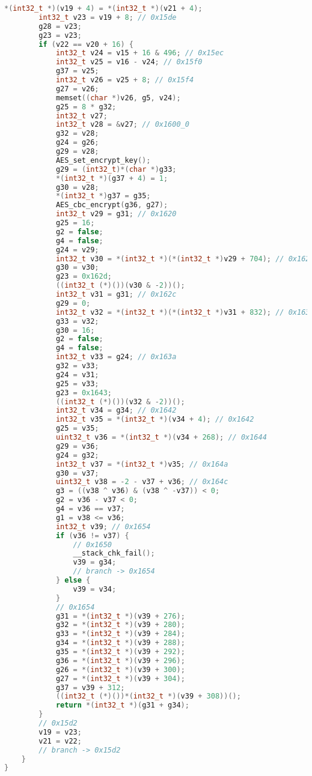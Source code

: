 \begin{appendices}
\begin{lstlisting}[language=C++, caption=Decompiled AES Encrypt(), label=dec_aes_encrypt]
        *(int32_t *)(v19 + 4) = *(int32_t *)(v21 + 4);
        int32_t v23 = v19 + 8; // 0x15de
        g28 = v23;
        g23 = v23;
        if (v22 == v20 + 16) {
            int32_t v24 = v15 + 16 & 496; // 0x15ec
            int32_t v25 = v16 - v24; // 0x15f0
            g37 = v25;
            int32_t v26 = v25 + 8; // 0x15f4
            g27 = v26;
            memset((char *)v26, g5, v24);
            g25 = 8 * g32;
            int32_t v27;
            int32_t v28 = &v27; // 0x1600_0
            g32 = v28;
            g24 = g26;
            g29 = v28;
            AES_set_encrypt_key();
            g29 = (int32_t)*(char *)g33;
            *(int32_t *)(g37 + 4) = 1;
            g30 = v28;
            *(int32_t *)g37 = g35;
            AES_cbc_encrypt(g36, g27);
            int32_t v29 = g31; // 0x1620
            g25 = 16;
            g2 = false;
            g4 = false;
            g24 = v29;
            int32_t v30 = *(int32_t *)(*(int32_t *)v29 + 704); // 0x1626
            g30 = v30;
            g23 = 0x162d;
            ((int32_t (*)())(v30 & -2))();
            int32_t v31 = g31; // 0x162c
            g29 = 0;
            int32_t v32 = *(int32_t *)(*(int32_t *)v31 + 832); // 0x1634
            g33 = v32;
            g30 = 16;
            g2 = false;
            g4 = false;
            int32_t v33 = g24; // 0x163a
            g32 = v33;
            g24 = v31;
            g25 = v33;
            g23 = 0x1643;
            ((int32_t (*)())(v32 & -2))();
            int32_t v34 = g34; // 0x1642
            int32_t v35 = *(int32_t *)(v34 + 4); // 0x1642
            g25 = v35;
            uint32_t v36 = *(int32_t *)(v34 + 268); // 0x1644
            g29 = v36;
            g24 = g32;
            int32_t v37 = *(int32_t *)v35; // 0x164a
            g30 = v37;
            uint32_t v38 = -2 - v37 + v36; // 0x164c
            g3 = ((v38 ^ v36) & (v38 ^ -v37)) < 0;
            g2 = v36 - v37 < 0;
            g4 = v36 == v37;
            g1 = v38 <= v36;
            int32_t v39; // 0x1654
            if (v36 != v37) {
                // 0x1650
                __stack_chk_fail();
                v39 = g34;
                // branch -> 0x1654
            } else {
                v39 = v34;
            }
            // 0x1654
            g31 = *(int32_t *)(v39 + 276);
            g32 = *(int32_t *)(v39 + 280);
            g33 = *(int32_t *)(v39 + 284);
            g34 = *(int32_t *)(v39 + 288);
            g35 = *(int32_t *)(v39 + 292);
            g36 = *(int32_t *)(v39 + 296);
            g26 = *(int32_t *)(v39 + 300);
            g27 = *(int32_t *)(v39 + 304);
            g37 = v39 + 312;
            ((int32_t (*)())*(int32_t *)(v39 + 308))();
            return *(int32_t *)(g31 + g34);
        }
        // 0x15d2
        v19 = v23;
        v21 = v22;
        // branch -> 0x15d2
    }
}
\end{lstlisting}



\end{appendices}

